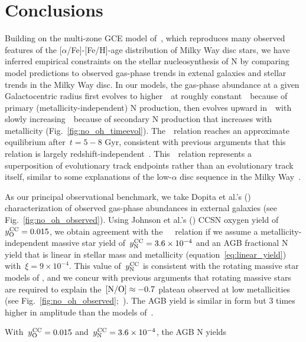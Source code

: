 \documentclass[ms.tex]{subfiles}
\begin{document}
\section{Conclusions}
\label{sec:conclusions}

Building on the multi-zone GCE model of~\citet{Johnson2021}, which reproduces
many observed features of the [$\alpha$/Fe]-[Fe/H]-age distribution of Milky
Way disc stars, we have inferred empirical constraints on the stellar
nucleosynthesis of N by comparing model predictions to observed gas-phase trends
in extenal galaxies and stellar trends in the Milky Way disc.
In our models, the gas-phase abundance at a given Galactocentric radius first
evolves to higher~\oh~at roughly constant~\no~because of primary
(metallicity-independent) N production, then evolves upward in~\no~with slowly
increasing~\oh~because of secondary N production that increases with
metallicity (Fig.~\ref{fig:no_oh_timeevol}).
The~\ohno~relation reaches an approximate equilibrium after~$t = 5 - 8$ Gyr,
consistent with previous arguments that this relation is largely
redshift-independent~\citep{Vincenzo2018, HaydenPawson2021}.
This~\ohno~relation represents a superposition of evolutionary track endpoints
rather than an evolutionary track itself, similar to some explanations of the
low-$\alpha$ disc sequence in the Milky Way~\citep[e.g.][]{Schoenrich2009,
Nidever2014, Buck2020, Sharma2021, Johnson2021}.
\par
As our principal observational benchmark, we take Dopita et
al.'s (\citeyear{Dopita2016}) characterization of observed gas-phase abundances
in external galaxies (see Fig.~\ref{fig:no_oh_observed}).
Using Johnson et al.'s (\citeyear{Johnson2021}) CCSN oxygen yield
of~$y_\text{O}^\text{CC} = 0.015$, we obtain agreement with
the~\citet{Dopita2016}~\ohno~relation if we assume a metallicity-independent
massive star yield of~$y_\text{N}^\text{CC} = 3.6\times10^{-4}$ and an AGB fractional N
yield that is linear in stellar mass and metallicity
(equation~\ref{eq:linear_yield}) with~$\xi = 9\times10^{-4}$.
This value of~$y_\text{N}^\text{CC}$ is consistent with the rotating massive star models of
\citet{Limongi2018}, and we concur with previous arguments that rotating massive
stars are required to explain the~$\text{[N/O]} \approx -0.7$ plateau observed at low
metallicities (see Fig.~\ref{fig:no_oh_observed};~\citealp{Chiappini2003,
Chiappini2005, Chiappini2006, Kobayashi2011, Prantzos2018, Grisoni2021}).
The AGB yield is similar in form but 3 times higher in amplitude than the
models of~\cristallo.
\par
With~$y_\text{O}^\text{CC} = 0.015$ and~$y_\text{N}^\text{CC} = 3.6\times10^{-4}$, the AGB N yields
\end{document}
